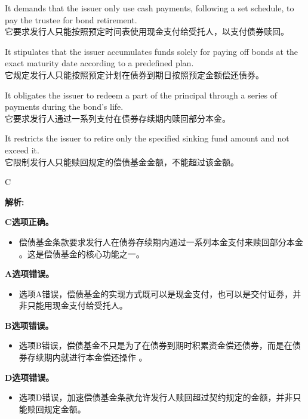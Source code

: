 \documentclass{article}
\newenvironment{explanation}
{\textbf{解析:}\par}
{\par}
\begin{document}
    \begin{choices}
        \item It demands that the issuer only use cash payments, following a set schedule, to pay the trustee for bond retirement.\\
        它要求发行人只能按照预定时间表使用现金支付给受托人，以支付债券赎回。
        \item It stipulates that the issuer accumulates funds solely for paying off bonds at the exact maturity date according to a predefined plan.\\
        它规定发行人只能按照预定计划在债券到期日按照预定金额偿还债券。
        \item It obligates the issuer to redeem a part of the principal through a series of payments during the bond's life.\\
        它要求发行人通过一系列支付在债券存续期内赎回部分本金。
        \item It restricts the issuer to retire only the specified sinking fund amount and not exceed it.\\
        它限制发行人只能赎回规定的偿债基金金额，不能超过该金额。
    \end{choices}
    
    \begin{correctanswer}
    C
    \end{correctanswer}
    
    \begin{explanation}
    \textbf{C选项正确。}
    \begin{itemize}
    \item 偿债基金条款要求发行人在债券存续期内通过一系列本金支付来赎回部分本金 。这是偿债基金的核心功能之一。
    \end{itemize}
    \textbf{A选项错误。}
    \begin{itemize}
    \item 选项A错误，偿债基金的实现方式既可以是现金支付，也可以是交付证券，并非只能用现金支付给受托人。
    \end{itemize}
    \textbf{B选项错误。}
    \begin{itemize}
    \item 选项B错误，偿债基金不只是为了在债券到期时积累资金偿还债券，而是在债券存续期内就进行本金偿还操作 。
    \end{itemize}
    \textbf{D选项错误。}
    \begin{itemize}
    \item 选项D错误，加速偿债基金条款允许发行人赎回超过契约规定的金额，并非只能赎回规定金额。
    \end{itemize}
    \end{explanation}
    
\end{document}
